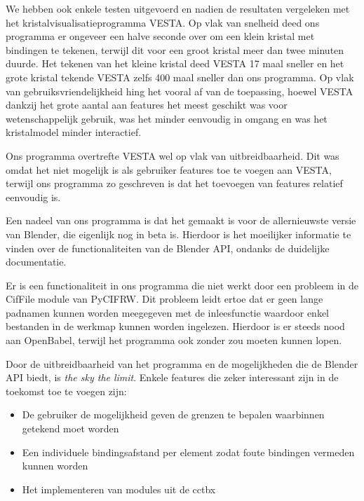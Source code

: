We hebben ook enkele testen uitgevoerd en nadien de resultaten vergeleken met het kristalvisualisatieprogramma VESTA. Op vlak van snelheid deed ons programma er ongeveer een halve seconde over om een klein kristal met bindingen te tekenen, terwijl dit voor een groot kristal meer dan twee minuten duurde. Het tekenen van het kleine kristal deed VESTA 17 maal sneller en het grote kristal tekende VESTA zelfs 400 maal sneller dan ons programma. Op vlak van gebruiksvriendelijkheid hing het vooral af van de toepassing, hoewel VESTA dankzij het grote aantal aan features het meest geschikt was voor wetenschappelijk gebruik, was het minder eenvoudig in omgang en was het kristalmodel minder interactief. 
\par
Ons programma overtrefte VESTA wel op vlak van uitbreidbaarheid. Dit was omdat het niet mogelijk is als gebruiker features toe te voegen aan VESTA, terwijl ons programma zo geschreven is dat het toevoegen van features relatief eenvoudig is. 
\par 
Een nadeel van ons programma is dat het gemaakt is voor de allernieuwste versie van Blender, die eigenlijk nog in beta is. Hierdoor is het moeilijker informatie te vinden over de functionaliteiten van de Blender API, ondanks de duidelijke documentatie.
\par
Er is een functionaliteit in ons programma die niet werkt door een probleem in de CifFile module van PyCIFRW. Dit probleem leidt ertoe dat er geen lange padnamen kunnen worden meegegeven met de inleesfunctie waardoor enkel bestanden in de werkmap kunnen worden ingelezen. Hierdoor is er steeds nood aan OpenBabel, terwijl het programma ook zonder zou moeten kunnen lopen.
\par
Door de uitbreidbaarheid van het programma en de mogelijkheden die de Blender API biedt, is \textit{the sky the limit}. Enkele features die zeker interessant zijn in de toekomst toe te voegen zijn:
\begin{itemize}
\item De gebruiker de mogelijkheid geven de grenzen te bepalen waarbinnen getekend moet worden
\item Een individuele bindingsafstand per element zodat foute bindingen vermeden kunnen worden
\item Het implementeren van modules uit de cctbx 
\end{itemize}
 